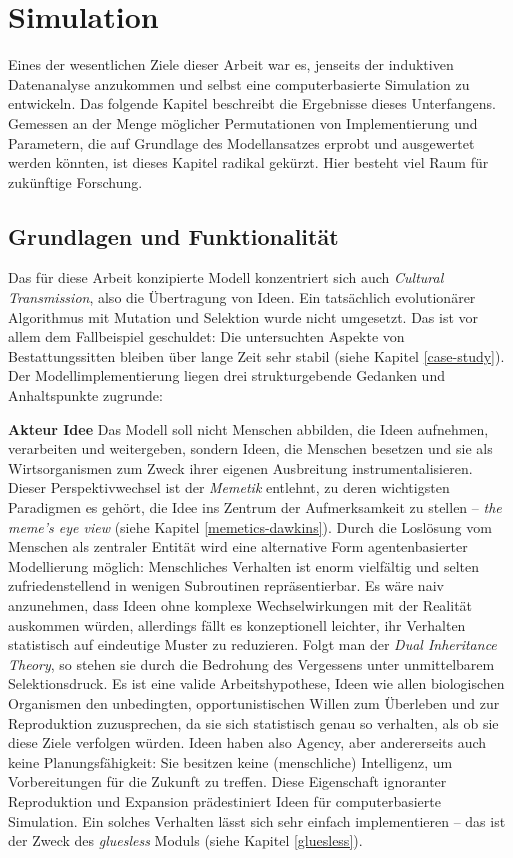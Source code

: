 \documentclass[openany,twoside,twocolumn]{book}
\begin{document}
\hypertarget{simulation}{%
\section{Simulation}\label{simulation}}

Eines der wesentlichen Ziele dieser Arbeit war es, jenseits der
induktiven Datenanalyse anzukommen und selbst eine computerbasierte
Simulation zu entwickeln. Das folgende Kapitel beschreibt die Ergebnisse
dieses Unterfangens. Gemessen an der Menge möglicher Permutationen von
Implementierung und Parametern, die auf Grundlage des Modellansatzes
erprobt und ausgewertet werden könnten, ist dieses Kapitel radikal
gekürzt. Hier besteht viel Raum für zukünftige Forschung.

\hypertarget{simulation-theorie}{%
\subsection{Grundlagen und Funktionalität}\label{simulation-theorie}}

Das für diese Arbeit konzipierte Modell konzentriert sich auch
\emph{Cultural Transmission}, also die Übertragung von Ideen. Ein
tatsächlich evolutionärer Algorithmus mit Mutation und Selektion wurde
nicht umgesetzt. Das ist vor allem dem Fallbeispiel geschuldet: Die
untersuchten Aspekte von Bestattungssitten bleiben über lange Zeit sehr
stabil (siehe Kapitel \ref{case-study}). Der Modellimplementierung
liegen drei strukturgebende Gedanken und Anhaltspunkte zugrunde:

\textbf{Akteur Idee} \newline  Das Modell soll nicht Menschen abbilden,
die Ideen aufnehmen, verarbeiten und weitergeben, sondern Ideen, die
Menschen besetzen und sie als Wirtsorganismen zum Zweck ihrer eigenen
Ausbreitung instrumentalisieren. Dieser Perspektivwechsel ist der
\emph{Memetik} entlehnt, zu deren wichtigsten Paradigmen es gehört, die
Idee ins Zentrum der Aufmerksamkeit zu stellen -- \emph{the meme's eye
view} (siehe Kapitel \ref{memetics-dawkins}). Durch die Loslösung vom
Menschen als zentraler Entität wird eine alternative Form
agentenbasierter Modellierung möglich: Menschliches Verhalten ist enorm
vielfältig und selten zufriedenstellend in wenigen Subroutinen
repräsentierbar. Es wäre naiv anzunehmen, dass Ideen ohne komplexe
Wechselwirkungen mit der Realität auskommen würden, allerdings fällt es
konzeptionell leichter, ihr Verhalten statistisch auf eindeutige Muster
zu reduzieren. Folgt man der \emph{Dual Inheritance Theory}, so stehen
sie durch die Bedrohung des Vergessens unter unmittelbarem
Selektionsdruck. Es ist eine valide Arbeitshypothese, Ideen wie allen
biologischen Organismen den unbedingten, opportunistischen Willen zum
Überleben und zur Reproduktion zuzusprechen, da sie sich statistisch
genau so verhalten, als ob sie diese Ziele verfolgen würden. Ideen haben
also Agency, aber andererseits auch keine Planungsfähigkeit: Sie
besitzen keine (menschliche) Intelligenz, um Vorbereitungen für die
Zukunft zu treffen. Diese Eigenschaft ignoranter Reproduktion und
Expansion prädestiniert Ideen für computerbasierte Simulation. Ein
solches Verhalten lässt sich sehr einfach implementieren -- das ist der
Zweck des \emph{gluesless} Moduls (siehe Kapitel \ref{gluesless}).
\end{document}
